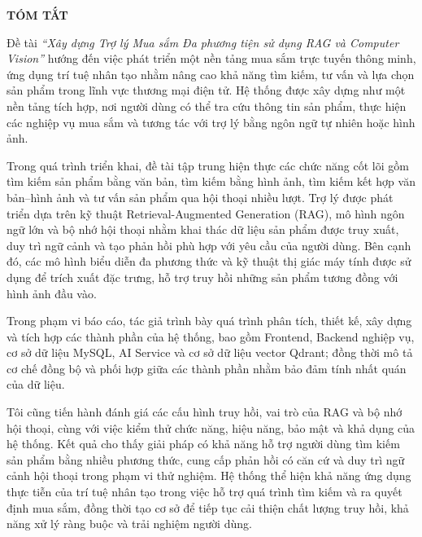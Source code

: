 \begin{center}
    \textbf{\Large TÓM TẮT}
\end{center}

Đề tài \textit{\enquote{Xây dựng Trợ lý Mua sắm Đa phương tiện sử dụng RAG và Computer Vision}} hướng đến việc phát triển một nền tảng mua sắm trực tuyến thông minh, ứng dụng trí tuệ nhân tạo nhằm nâng cao khả năng tìm kiếm, tư vấn và lựa chọn sản phẩm trong lĩnh vực thương mại điện tử. Hệ thống được xây dựng như một nền tảng tích hợp, nơi người dùng có thể tra cứu thông tin sản phẩm, thực hiện các nghiệp vụ mua sắm và tương tác với trợ lý bằng ngôn ngữ tự nhiên hoặc hình ảnh.

Trong quá trình triển khai, đề tài tập trung hiện thực các chức năng cốt lõi gồm tìm kiếm sản phẩm bằng văn bản, tìm kiếm bằng hình ảnh, tìm kiếm kết hợp văn bản--hình ảnh và tư vấn sản phẩm qua hội thoại nhiều lượt. Trợ lý được phát triển dựa trên kỹ thuật Retrieval-Augmented Generation (RAG), mô hình ngôn ngữ lớn và bộ nhớ hội thoại nhằm khai thác dữ liệu sản phẩm được truy xuất, duy trì ngữ cảnh và tạo phản hồi phù hợp với yêu cầu của người dùng. Bên cạnh đó, các mô hình biểu diễn đa phương thức và kỹ thuật thị giác máy tính được sử dụng để trích xuất đặc trưng, hỗ trợ truy hồi những sản phẩm tương đồng với hình ảnh đầu vào.

Trong phạm vi báo cáo, tác giả trình bày quá trình phân tích, thiết kế, xây dựng và tích hợp các thành phần của hệ thống, bao gồm Frontend, Backend nghiệp vụ, cơ sở dữ liệu MySQL, AI Service và cơ sở dữ liệu vector Qdrant; đồng thời mô tả cơ chế đồng bộ và phối hợp giữa các thành phần nhằm bảo đảm tính nhất quán của dữ liệu.

Tôi cũng tiến hành đánh giá các cấu hình truy hồi, vai trò của RAG và bộ nhớ hội thoại, cùng với việc kiểm thử chức năng, hiệu năng, bảo mật và khả dụng của hệ thống. Kết quả cho thấy giải pháp có khả năng hỗ trợ người dùng tìm kiếm sản phẩm bằng nhiều phương thức, cung cấp phản hồi có căn cứ và duy trì ngữ cảnh hội thoại trong phạm vi thử nghiệm. Hệ thống thể hiện khả năng ứng dụng thực tiễn của trí tuệ nhân tạo trong việc hỗ trợ quá trình tìm kiếm và ra quyết định mua sắm, đồng thời tạo cơ sở để tiếp tục cải thiện chất lượng truy hồi, khả năng xử lý ràng buộc và trải nghiệm người dùng.
